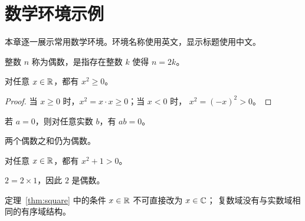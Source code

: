 \chapter{数学环境示例}
\label{chap:environments}

本章逐一展示常用数学环境。环境名称使用英文，显示标题使用中文。

\begin{definition}[偶数]
整数 $n$ 称为偶数，是指存在整数 $k$ 使得 $n=2k$。
\end{definition}

\begin{theorem}
\label{thm:square}
对任意 $x\in\mathbb{R}$，都有 $x^2\geq 0$。
\end{theorem}

\begin{proof}
当 $x\geq 0$ 时，$x^2=x\cdot x\geq 0$；当 $x<0$ 时，
$x^2=(-x)^2>0$。
\end{proof}

\begin{lemma}
若 $a=0$，则对任意实数 $b$，有 $ab=0$。
\end{lemma}

\begin{proposition}
两个偶数之和仍为偶数。
\end{proposition}

\begin{corollary}
对任意 $x\in\mathbb{R}$，都有 $x^2+1>0$。
\end{corollary}

\begin{example}
$2=2\times 1$，因此 $2$ 是偶数。
\end{example}

\begin{remark}
定理~\ref{thm:square} 中的条件 $x\in\mathbb{R}$ 不可直接改为 $x\in\mathbb{C}$；
复数域没有与实数域相同的有序域结构。
\end{remark}
